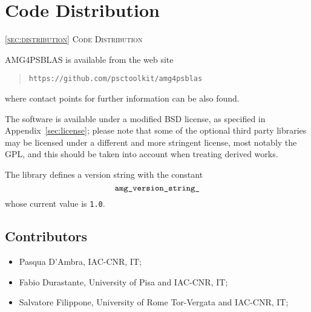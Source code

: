 \section{Code Distribution\label{sec:distribution}}
         {\textsc{\ref{sec:distribution} Code Distribution}}

\noindent
AMG4PSBLAS is available from the web site
\begin{quotation}
\texttt{https://github.com/psctoolkit/amg4psblas}
\end{quotation}
where contact points for further information can be also found.

The software is available under a modified BSD license, as specified
in Appendix~\ref{sec:license}; please note that some of the optional
third party libraries may be licensed under a different and more
stringent license, most notably the GPL, and this should be taken into
account when treating derived works.

The library defines a version string with the
constant
\[ \verb|amg_version_string_|\]
whose current value is \verb|1.0|.

\subsection*{Contributors}
\begin{itemize}
\item Pasqua D'Ambra, IAC-CNR, IT;			
\item Fabio Durastante, University of Pisa and IAC-CNR, IT;
\item Salvatore  Filippone, University of Rome Tor-Vergata and IAC-CNR, IT;				
\end{itemize}